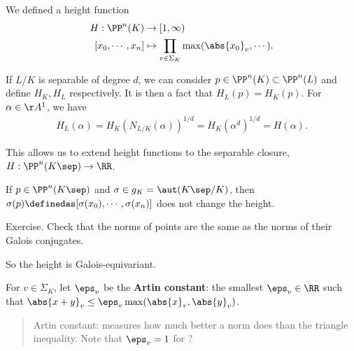 We defined a height function \begin{align*}
H: \PP^n(K) &\to [1,\infty) \\
[x_0, \cdots, x_n] &\mapsto \prod_{v\in \Sigma_K} \max(\abs{x_0}_v, \cdots)
.\end{align*}

If \(L/K\) is separable of degree \(d\), we can consider
\(p\in \PP^n(K) \subset \PP^n(L)\) and define \(H_K, H_L\) respectively.
It is then a fact that \(H_L(p) = H_K(p)\). For \(\alpha \in \AA^1\), we
have
\begin{align*}
H_L(\alpha) = H_K(N_{L/K}(\alpha))^{1/d} = H_K(\alpha^d)^{1/d} = H(\alpha)
.\end{align*}

This allows us to extend height functions to the separable closure,
\(H: \PP^n(K\sep) \to \RR\).

\begin{description}
\tightlist
\item[Lemma]
If \(p\in \PP^n(K\sep)\) and \(\sigma \in g_K = \aut(K\sep/K)\), then
\(\sigma(p) \definedas [\sigma(x_0), \cdots, \sigma(x_n)]\) does not
change the height.
\item[Proof]
Exercise. Check that the norms of points are the same as the norms of
their Galois conjugates.
\end{description}

So the height is Galois-equivariant.

For \(v\in \Sigma_K\), let \(\eps_v\) be the \textbf{Artin constant}:
the smallest \(\eps_v \in \RR\) such that
\(\abs{x + y}_v \leq \eps_v \max(\abs{x}_v, \abs{y}_v)\).

\begin{quote}
Artin constant: measures how much better a norm does than the triangle
inequality. Note that \(\eps_v = 1\) for ?
\end{quote}

